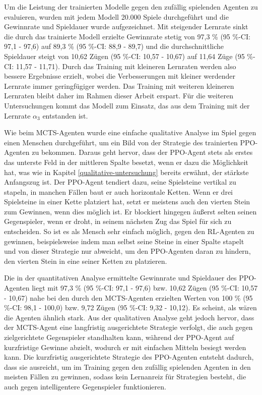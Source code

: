 Um die Leistung der trainierten Modelle gegen den zufällig spielenden Agenten zu evaluieren, wurden mit jedem Modell 20.000 Spiele durchgeführt und die Gewinnrate und Spieldauer wurde aufgezeichnet. Mit steigender Lernrate sinkt die durch das trainierte Modell erzielte Gewinnrate stetig von 97,3 \% (95 \%-CI: 97,1 - 97,6) auf 89,3 \% (95 \%-CI: 88,9 - 89,7) und die durchschnittliche Spieldauer steigt von 10,62 Zügen (95 \%-CI: 10,57 - 10,67) auf 11,64 Züge (95 \%-CI: 11,57 - 11,71). Durch das Training mit kleineren Lernraten werden also bessere Ergebnisse erzielt, wobei die Verbesserungen mit kleiner werdender Lernrate immer geringfügiger werden. Das Training mit weiteren kleineren Lernraten bleibt daher im Rahmen dieser Arbeit erspart. Für die weiteren Untersuchungen kommt das Modell zum Einsatz, das aus dem Training mit der Lernrate $\alpha_3$ entstanden ist.

Wie beim MCTS-Agenten wurde eine einfache qualitative Analyse im Spiel gegen einen Menschen durchgeführt, um ein Bild von der Strategie des trainierten PPO-Agenten zu bekommen. Daraus geht hervor, dass der PPO-Agent stets als erstes das unterste Feld in der mittleren Spalte besetzt, wenn er dazu die Möglichkeit hat, was wie in Kapitel \ref{qualitative-untersuchung} bereits erwähnt, der stärkste Anfangszug ist. Der PPO-Agent tendiert dazu, seine Spielsteine vertikal zu stapeln, in manchen Fällen baut er auch horizontale Ketten. Wenn er drei Spielsteine in einer Kette platziert hat, setzt er meistens auch den vierten Stein zum Gewinnen, wenn dies möglich ist. Er blockiert hingegen äußerst selten seinen Gegenspieler, wenn er droht, in seinem nächsten Zug das Spiel für sich zu entscheiden. So ist es als Mensch sehr einfach möglich, gegen den RL-Agenten zu gewinnen, beispielsweise indem man selbst seine Steine in einer Spalte stapelt und von dieser Strategie nur abweicht, um den PPO-Agenten daran zu hindern, den vierten Stein in eine seiner Ketten zu platzieren.

Die in der quantitativen Analyse ermittelte Gewinnrate und Spieldauer des PPO-Agenten liegt mit 97,3 \% (95 \%-CI: 97,1 - 97,6) bzw. 10,62 Zügen (95 \%-CI: 10,57 - 10,67) nahe bei den durch den MCTS-Agenten erzielten Werten von 100 \% (95 \%-CI: 98,1 - 100,0) bzw. 9,72 Zügen (95 \%-CI: 9,32 - 10,12). Es scheint, als wären die Agenten ähnlich stark. Aus der qualitativen Analyse geht jedoch hervor, dass der MCTS-Agent eine langfristig ausgerichtete Strategie verfolgt, die auch gegen zielgerichtete Gegenspieler standhalten kann, während der PPO-Agent auf kurzfristige Gewinne abzielt, wodurch er mit einfachen Mitteln besiegt werden kann. Die kurzfristig ausgerichtete Strategie des PPO-Agenten entsteht dadurch, dass sie ausreicht, um im Training gegen den zufällig spielenden Agenten in den meisten Fällen zu gewinnen, sodass kein Lernanreiz für Strategien besteht, die auch gegen intelligentere Gegenspieler funktionieren.

